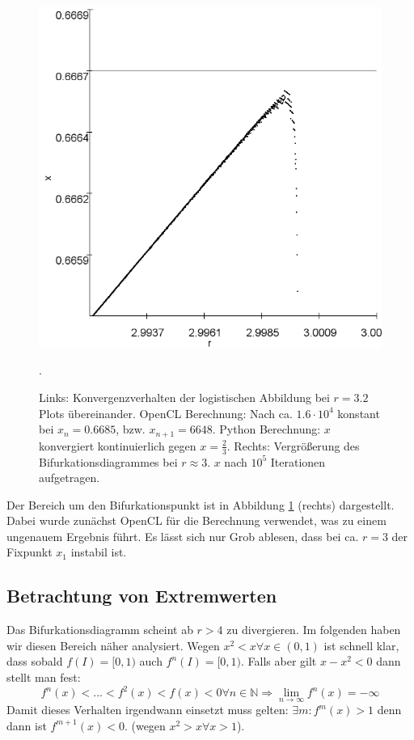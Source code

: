\documentclass{scrartcl}
\begin{document}
\begin{figure}
\includegraphics[scale=0.3]{log-bifurc-umr3}
\caption{Links: Konvergenzverhalten der logistischen Abbildung bei $r=3. 2$ Plots übereinander. OpenCL Berechnung: Nach ca. $1.6 \cdot 10^4$ konstant bei $x_n=0.6685$, bzw. $x_{n+1}=6648$. Python Berechnung: $x$ konvergiert kontinuierlich gegen $x=\frac{2}{3}$. Rechts: Vergrößerung des Bifurkationsdiagrammes bei $r\approx3$. $x$ nach $10^5$ Iterationen aufgetragen.}. 
\label{fig:log-konv1}
\end{figure}
Der Bereich um den Bifurkationspunkt ist in Abbildung \ref{fig:log-konv1} (rechts) dargestellt. Dabei wurde zunächst OpenCL für die Berechnung verwendet, was zu einem ungenauem Ergebnis führt. Es lässt sich nur Grob ablesen, dass bei ca. $r=3$ der Fixpunkt $x_1$ instabil ist.
\newpage
\subsection{Betrachtung von Extremwerten}
Das Bifurkationsdiagramm scheint ab $r>4$ zu divergieren. Im folgenden haben wir diesen Bereich näher analysiert. 
Wegen  $x^2 < x \forall x \in (0,1)$ ist schnell klar, dass sobald $f(I) = [0,1)$ auch $f^n(I) = [0, 1)$. 
Falls aber gilt $x-x^2 < 0$ dann stellt man fest:
\begin{equation}
f^n(x) < ... < f^{2}(x) < f(x) < 0 \forall n \in \mathbb{N} \Rightarrow \lim_{n \rightarrow \infty} f^n(x) = -\infty
\end{equation}
Damit dieses Verhalten irgendwann einsetzt muss gelten: $\exists m: f^m(x) > 1$ denn dann ist $f^{m+1}(x) < 0.$ (wegen $x^2 > x \forall x > 1$). 
\end{document}
